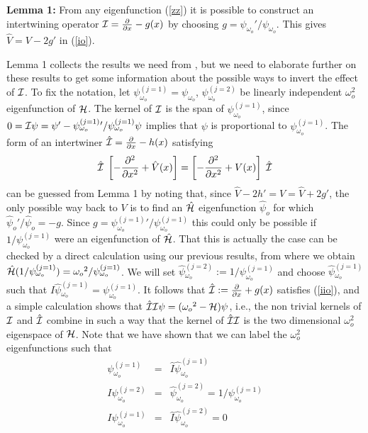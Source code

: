 \documentclass[aps,floats,showpacs,amssymb,tightenlines]{revtex4}
\def\w{\omega}
\def\p{\partial}
\def\I{{\cal I}}
\def\po{\psi_{\w_o}}
\def\pe{\psi_{\w_o}^{(j=1)}{}}
\begin{document}
\vspace{.3cm}

\noindent
{\bf Lemma 1:} From any eigenfunction (\ref{zz}) it is possible to construct an intertwining operator
 $\I= \frac{\p}{\p x} -g(x)$  by choosing
$g = \po' / \po$. This gives  $\hat V = V - 2 g'$ in (\ref{io}).

\vspace{.3cm}

Lemma 1 collects the results we  need from \cite{price},
but  we need to elaborate further on these results to get some information  about
the possible ways to invert the effect of $\I$.  To fix the notation, let  $\psi_{\w_o}^{(j=1)}=\po$,
$\psi_{\w_o}^{(j=2)}$ be linearly independent $\w_o^2$ eigenfunction of ${\cal H}$. The
kernel of $\I$ is the span of $\pe$, since   $0 = \I \psi = \psi' - \pe '
/ \pe \psi$ implies that $\psi$ is proportional to $\pe$. The form
of an intertwiner $\hat \I = \frac{\p}{\p x} -h(x)$
satisfying
\begin{equation} \label{iio}
\hat \I \; \left[ - \frac{\p^2 }{\p x^2} + \hat  V(x) \right]  =
\left[ - \frac{\p^2 }{\p x^2} +  V(x) \right] \; \hat \I
\end{equation}
can be guessed from Lemma 1 by noting that, since $\hat V - 2h' = V =
\hat V + 2g'$, the only possible way back to $V$ is to find an $\hat
{\cal H}$ eigenfunction $\hat \psi_o$ for which $\hat \psi_o ' / \hat \psi_o =-g$.
Since $g = \pe'/\pe$ this could only be possible if $ 1/\pe
$ were an eigenfunction of $\hat  {\cal H}$. That this is actually the
case can be checked by a direct calculation
 using our previous results, from where we obtain
  $\hat {\cal H}  (1/ \pe) = \w_o{}^ 2 /\pe$. We will set $\hat \psi {}_{\w_o}^{(j=2)} := 1/\pe$ and
  choose $\hat \psi {}_{\w_o}^{(j=1)}$ such that $\hat I \hat \psi {}_{\w_o}^{(j=1)} = \pe$.
  It follows that $\hat \I := \frac{\p}{\p x} + g(x)$ satisfies (\ref{iio}), and a simple calculation shows that
$\hat \I \I \psi = (\w_o{}^2 - {\cal H}) \psi$, i.e., the non trivial kernels of $\I$ and $\hat \I$ combine
in such a way that the kernel of $\hat \I \I$ is the two dimensional $\w_o^2$ eigenspace of ${\cal H}$. Note that we have
shown that we can label the $\w_o^2$ eigenfunctions
 such that
\begin{eqnarray} \nonumber
\pe &=&  \hat I \hat \psi _{\w_o}^{(j=1)}\\ \label{qsy}
I \psi _{\w_o}^{(j=2)} &=&  \hat \psi _{\w_o}^{(j=2)} = 1 / \pe \\
I \psi _{\w_o}^{(j=1)} &=& \hat I \hat \psi _{\w_o}^{(j=2)} =0\nonumber
\end{eqnarray}
\end{document}
